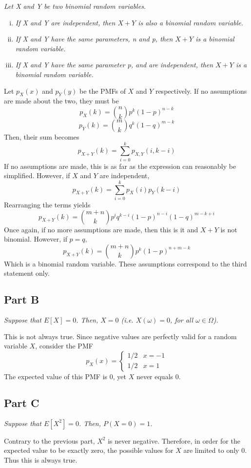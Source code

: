 \documentclass{article}
\begin{document}
\textit{Let X and Y be two binomial random variables.}

\begin{enumerate}[i.]
    \item \textit{If X and Y are independent, then $ X + Y $ is also a
    binomial random variable.}
    \item \textit{If X and Y have the same parameters, n and p, then $ X + Y
    $ is a binomial random variable.}
    \item \textit{If X and Y have the same parameter p, and are independent,
    then $ X + Y $ is a binomial random variable.}
\end{enumerate}

\bigbreak

Let $ p_X(x) $ and $ p_Y(y) $ be the PMFs of $ X $ and $ Y $ respectively. If
no assumptions are made about the two, they must be
$$ p_X(k) = \binom{n}{k} p^k (1 - p)^{n - k} $$
$$ p_Y(k) = \binom{m}{k} q^k (1 - q)^{m - k} $$
Then, their sum becomes
$$ p_{X+Y}(k) = \sum\limits_{i = 0}^k p_{X,Y}(i, k - i) $$
If no assumptions are made, this is as far as the expression can reasonably
be simplified. However, if $ X $ and $ Y $ are independent,
$$ p_{X+Y}(k) = \sum\limits_{i = 0}^k p_X(i) p_Y(k - i) $$
Rearranging the terms yields
$$ p_{X+Y}(k) = \binom{m + n}{k} p^i q^{k - i} (1 - p)^{n - i} (1 - q)^{m - k
+ i} $$
Once again, if no more assumptions are made, then this is it and $ X + Y $ is
not binomial. However, if $ p = q $,
$$ p_{X+Y}(k) = \binom{m + n}{k} p^k (1 - p)^{n + m - k} $$
Which is a binomial random variable. These assumptions correspond to the
third statement only.

\subsection*{Part B}

\textit{Suppose that $ E[X] = 0 $. Then, $ X = 0 $ (i.e. $ X(\omega) = 0 $,
for all $ \omega \in \Omega $).}

\bigbreak

This is not always true. Since negative values are perfectly valid for a
random variable $ X $, consider the PMF
$$ p_X(x) = \begin{cases}
    1/2 & x = -1 \\
    1/2 & x = 1
\end{cases} $$
The expected value of this PMF is $ 0 $, yet $ X $ never equals $ 0 $.

\subsection*{Part C}

\textit{Suppose that $ E[X^2] = 0 $. Then, $ P(X = 0) = 1 $.}

\bigbreak

Contrary to the previous part, $ X^2 $ is never negative. Therefore, in order
for the expected value to be exactly zero, the possible values for $ X $ are
limited to only $ 0 $. Thus this is always true.
\end{document}
